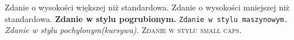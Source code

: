 \documentclass[11pt,a4paper,nottitlepage,]{article}
\begin{document}
{\Large Zdanie o wysokości większej niż standardowa.} \newline
{\tiny Zdanie o wysokości mniejszej niż standardowa.} \newline
\textbf{Zdanie w stylu pogrubionym.} \newline
\texttt{Zdanie w stylu maszynowym.}	\newline
\emph{Zdanie w stylu pochylonym(kursywa).}	\newline
\textsc{Zdanie w stylu small caps.}	\newline
\end{document}
